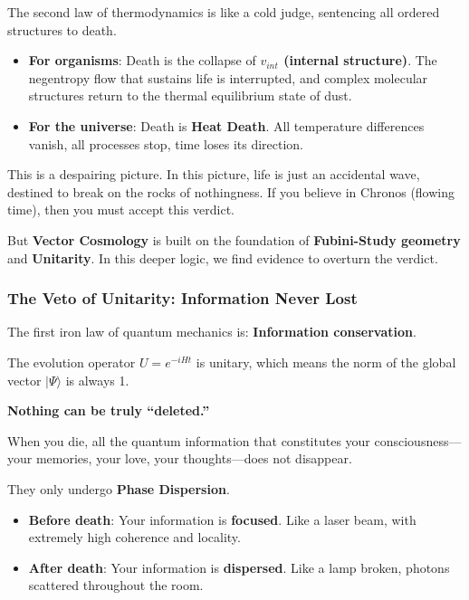 The second law of thermodynamics is like a cold judge, sentencing all ordered structures to death.

\begin{itemize}
\item \textbf{For organisms}: Death is the collapse of \textbf{$v_{int}$ (internal structure)}. The negentropy flow that sustains life is interrupted, and complex molecular structures return to the thermal equilibrium state of dust.

\item \textbf{For the universe}: Death is \textbf{Heat Death}. All temperature differences vanish, all processes stop, time loses its direction.
\end{itemize}

This is a despairing picture. In this picture, life is just an accidental wave, destined to break on the rocks of nothingness. If you believe in Chronos (flowing time), then you must accept this verdict.

But \textbf{Vector Cosmology} is built on the foundation of \textbf{Fubini-Study geometry} and \textbf{Unitarity}. In this deeper logic, we find evidence to overturn the verdict.

\subsubsection{The Veto of Unitarity: Information Never Lost}

The first iron law of quantum mechanics is: \textbf{Information conservation}.

The evolution operator $U = e^{-iHt}$ is unitary, which means the norm of the global vector $|\Psi\rangle$ is always 1.

\textbf{Nothing can be truly ``deleted.''}

When you die, all the quantum information that constitutes your consciousness---your memories, your love, your thoughts---does not disappear.

They only undergo \textbf{Phase Dispersion}.

\begin{itemize}
\item \textbf{Before death}: Your information is \textbf{focused}. Like a laser beam, with extremely high coherence and locality.

\item \textbf{After death}: Your information is \textbf{dispersed}. Like a lamp broken, photons scattered throughout the room.
\end{itemize}


